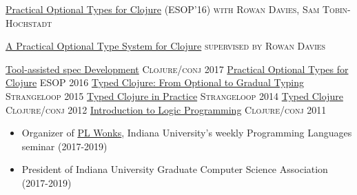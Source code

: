 \documentclass[10pt,a4paper]{article}
\begin{document}
\headedsection
  {\href{http://frenchy64.github.io/papers/esop16-short.pdf}{Practical Optional Types for Clojure}
  (ESOP'16)}
  {\textsc{with Rowan Davies, Sam Tobin-Hochstadt}} {%
    {}
}


\headedsection
  {\href{https://s3.amazonaws.com/github/downloads/frenchy64/papers/ambrose-honours.pdf}{A Practical Optional Type System for Clojure} }
  {\textsc{supervised by Rowan Davies}} {%
}


%





\headedsection
  {\href{https://www.youtube.com/watch?v=kcZVkvO1Dpo}{Tool-assisted spec Development}}
  {\textsc{Clojure/conj 2017}} {%
}
\headedsection
  {\href{http://ambrosebs.com/talks/esop16.pdf}{Practical Optional Types for Clojure}}
  {\textsc{ESOP 2016}} {%
  }
\headedsection
  {\href{https://www.youtube.com/watch?v=yG9CffLlXx0}{Typed Clojure: From Optional to Gradual Typing}}
  {\textsc{Strangeloop 2015}} {%
}
\headedsection
  {\href{https://www.youtube.com/watch?v=a0gT0syAXsY}{Typed Clojure in Practice}}
  {\textsc{Strangeloop 2014}} {%
}
\headedsection
  {\href{https://www.youtube.com/watch?v=a0gT0syAXsY}{Typed Clojure}}
  {\textsc{Clojure/conj 2012}} {%
}
\headedsection
  {\href{https://www.youtube.com/watch?v=irjP8BO1B8Y}{Introduction to Logic Programming}}
  {\textsc{Clojure/conj 2011}} {%
}

%
%

\bodytext
  {
\begin{itemize}
  \item Organizer of \href{http://wonks.github.io}{PL Wonks}, Indiana University's weekly Programming Languages seminar
    (2017-2019)
  \item President of Indiana University Graduate Computer Science Association
    (2017-2019)
\end{itemize}
    }
\end{document}
